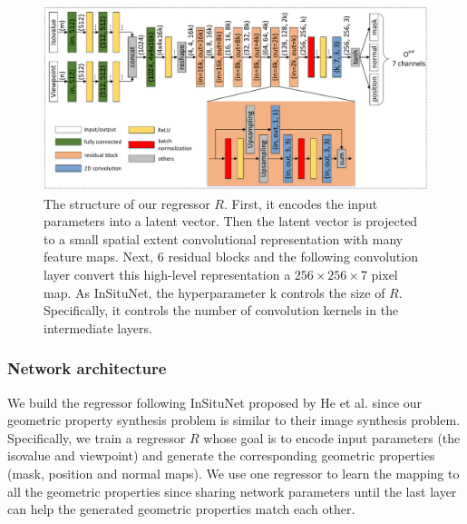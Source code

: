 \documentclass[journal]{vgtc}                %
\begin{document}
\begin{figure}
  \centering
  \includegraphics[width=1\linewidth]{regressor}
  \caption{The structure of our regressor $R$. First, it encodes the input parameters into a latent vector. Then the latent vector is projected to a small spatial extent convolutional representation with many feature maps. Next, $6$ residual blocks and the following convolution layer convert this high-level representation a $256 \times 256 \times 7$ pixel map. As InSituNet, the hyperparameter k controls the size of $R$. Specifically, it controls the number of convolution kernels in the intermediate layers.}
  \label{fig:regressor}
\end{figure}

\subsubsection{Network architecture}
\label{subsection:architecture}
We build the regressor following InSituNet proposed by He et al. \cite{he2019insitunet} since our geometric property synthesis problem is similar to their image synthesis problem. Specifically, we train a regressor $R$ whose goal is to encode input parameters (the isovalue and viewpoint) and generate the corresponding geometric properties (mask, position and normal maps). We use one regressor to learn the mapping to all the geometric properties since sharing network parameters until the last layer can help the generated geometric properties match each other.
\end{document}
